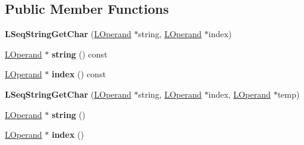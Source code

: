 \subsection*{Public Member Functions}
\begin{DoxyCompactItemize}
\item 
{\bfseries L\+Seq\+String\+Get\+Char} (\hyperlink{classv8_1_1internal_1_1_l_operand}{L\+Operand} $\ast$string, \hyperlink{classv8_1_1internal_1_1_l_operand}{L\+Operand} $\ast$index)\hypertarget{classv8_1_1internal_1_1_l_seq_string_get_char_adb8f1b93f681bfef2344f29989817d32}{}\label{classv8_1_1internal_1_1_l_seq_string_get_char_adb8f1b93f681bfef2344f29989817d32}

\item 
\hyperlink{classv8_1_1internal_1_1_l_operand}{L\+Operand} $\ast$ {\bfseries string} () const \hypertarget{classv8_1_1internal_1_1_l_seq_string_get_char_adea62a6e01de1e0d59ade25564ca1873}{}\label{classv8_1_1internal_1_1_l_seq_string_get_char_adea62a6e01de1e0d59ade25564ca1873}

\item 
\hyperlink{classv8_1_1internal_1_1_l_operand}{L\+Operand} $\ast$ {\bfseries index} () const \hypertarget{classv8_1_1internal_1_1_l_seq_string_get_char_ac5a44b95a522a0af0af1d577adf21a36}{}\label{classv8_1_1internal_1_1_l_seq_string_get_char_ac5a44b95a522a0af0af1d577adf21a36}

\item 
{\bfseries L\+Seq\+String\+Get\+Char} (\hyperlink{classv8_1_1internal_1_1_l_operand}{L\+Operand} $\ast$string, \hyperlink{classv8_1_1internal_1_1_l_operand}{L\+Operand} $\ast$index, \hyperlink{classv8_1_1internal_1_1_l_operand}{L\+Operand} $\ast$temp)\hypertarget{classv8_1_1internal_1_1_l_seq_string_get_char_ac9f7405260b9819a11ea2724ba68a92c}{}\label{classv8_1_1internal_1_1_l_seq_string_get_char_ac9f7405260b9819a11ea2724ba68a92c}

\item 
\hyperlink{classv8_1_1internal_1_1_l_operand}{L\+Operand} $\ast$ {\bfseries string} ()\hypertarget{classv8_1_1internal_1_1_l_seq_string_get_char_a1f4a879d90fee47d218c5cecbd7b9a13}{}\label{classv8_1_1internal_1_1_l_seq_string_get_char_a1f4a879d90fee47d218c5cecbd7b9a13}

\item 
\hyperlink{classv8_1_1internal_1_1_l_operand}{L\+Operand} $\ast$ {\bfseries index} ()\hypertarget{classv8_1_1internal_1_1_l_seq_string_get_char_a520290f5b98ea34c3b37e87559f6518c}{}\label{classv8_1_1internal_1_1_l_seq_string_get_char_a520290f5b98ea34c3b37e87559f6518c}


\end{DoxyCompactItemize}
